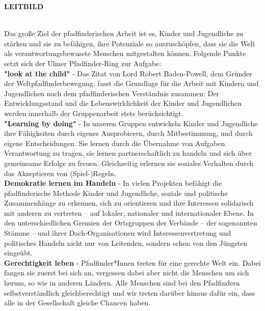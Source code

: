 \begin{Large}
    \textbf{LEITBILD}
\end{Large}
\\

Das große Ziel der pfadfinderischen Arbeit ist es, Kinder und Jugendliche zu stärken und sie zu 
befähigen, ihre Potenziale so auszuschöpfen, dass sie die Welt als verantwortungsbewusste Menschen 
mitgestalten können. Folgende Punkte setzt sich der Ulmer Pfadfinder-Ring zur Aufgabe:
\\

\textbf{"look at the child"} - Das Zitat von Lord Robert Baden-Powell, dem Gründer der 
Weltpfadfinderbewegung, fasst die Grundlage für die Arbeit mit Kindern und Jugendlichen nach dem 
pfadfinderischen Verständnis zusammen: Der Entwicklungsstand und die Lebenswirklichkeit der Kinder 
und Jugendlichen werden innerhalb der Gruppenarbeit stets berücksichtigt. 
\\

\textbf{"Learning by doing"} - In unseren Gruppen entwickeln Kinder und Jugendliche ihre Fähigkeiten 
durch eigenes Ausprobieren, durch Mitbestimmung, und durch eigene Entscheidungen. Sie lernen durch 
die Übernahme von Aufgaben Verantwortung zu tragen, sie lernen partnerschaftlich zu handeln und 
sich über gemeinsame Erfolge zu freuen. Gleichzeitig erlernen sie soziales Verhalten durch das 
Akzeptieren von (Spiel-)Regeln.
\\

\textbf{Demokratie lernen im Handeln} - In vielen Projekten befähigt die pfadfinderische Methode 
Kinder und Jugendliche, soziale und politische Zusammenhänge zu erkennen, sich zu orientieren und 
ihre Interessen solidarisch mit anderen zu vertreten – auf lokaler, nationaler und internationaler 
Ebene. In den unterschiedlichen Gremien der Ortsgruppen der Verbände – der sogenannten Stämme – und 
ihrer Dach-Organisationen wird Interessenvertretung und politisches Handeln nicht nur von 
Leitenden, sondern schon von den Jüngsten eingeübt.
\\

\textbf{Gerechtigkeit leben} - Pfadfinder*Innen treten für eine gerechte Welt ein. Dabei fangen sie 
zuerst bei sich an, vergessen dabei aber nicht die Menschen um sich herum, so wie in anderen 
Ländern. Alle Menschen sind bei den Pfadfindern selbstverständlich gleichberechtigt und wir treten 
darüber hinaus dafür ein, dass alle in der Gesellschaft gleiche Chancen haben.
\\

